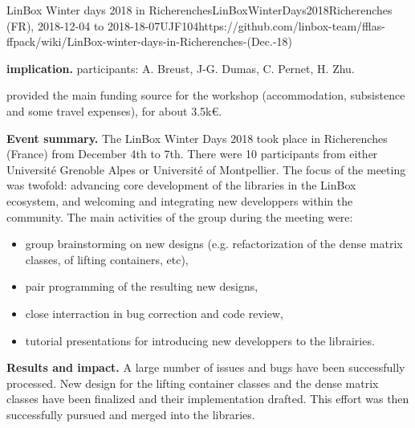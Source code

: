 \begin{event}{LinBox Winter days 2018 in Richerenches}{LinBoxWinterDays2018}{Richerenches (FR),
2018-12-04 to 2018-18-07}{UJF}{10}{4}{https://github.com/linbox-team/fflas-ffpack/wiki/LinBox-winter-days-in-Richerenches-(Dec.-18)}

\textbf{\ODK implication.} \ODK participants: A. Breust, J-G. Dumas, C. Pernet, H. Zhu.

\ODK provided the main funding source for the workshop (accommodation,
subsistence and some travel expenses), for about 3.5k\euro.

\textbf{Event summary.} The LinBox Winter Days 2018 took place in Richerenches
(France) from December 4th to 7th.
There were 10 participants from either Université Grenoble Alpes or Université of Montpellier. The focus of the meeting
was twofold: advancing core development of the libraries in the LinBox ecosystem, and welcoming and integrating new
developpers within the community. The main activities of the group during the meeting were:
\begin{itemize}
\item group brainstorming on new designs (e.g. refactorization of the dense matrix classes, of lifting containers, etc),
\item pair programming of the resulting new designs,
\item close interraction in bug correction and code review,
\item tutorial presentations for introducing new developpers to the librairies.
\end{itemize}

\textbf{Results and impact.} A large number of issues and bugs have been successfully processed. New design for the
lifting container classes and the dense matrix classes have been finalized and their implementation drafted. This effort
was then successfully pursued and merged into the libraries.

\end{event}
